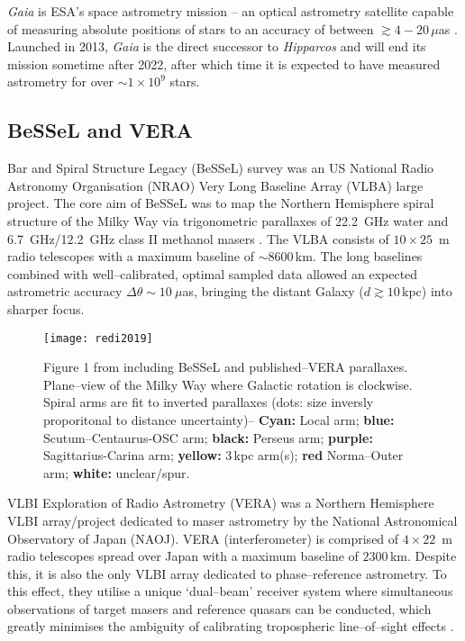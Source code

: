 		   {\it Gaia} is ESA's space astrometry mission -- an optical astrometry satellite capable of measuring absolute positions of stars to an accuracy of between $\gtrsim4-20\,\mu$as \citep[depending on magnitude and band; ][]{Perryman2002}. Launched in 2013, {\it Gaia} is the direct successor to {\it Hipparcos} and will end its mission sometime after 2022, after which time it is expected to have measured astrometry for over $\sim1\times10^9$ stars.
		
		    	        	
		\subsection{BeSSeL and VERA}
        Bar and Spiral Structure Legacy (BeSSeL) survey was an US National Radio Astronomy Organisation (NRAO) Very Long Baseline Array (VLBA) large project. The core aim of BeSSeL was to map the Northern Hemisphere spiral structure of the Milky Way via trigonometric parallaxes of 22.2~GHz water and 6.7~GHz/12.2~GHz class II methanol masers \citep{Brunthaler2011,Reid2009,Reid2014,Reid2019}. The VLBA consists of $10\times25$~m radio telescopes with a maximum baseline of $\sim8600$\,km. The long baselines combined with well--calibrated, optimal sampled data allowed an expected astrometric accuracy $\Delta\theta\sim10~\mu$as, bringing the distant Galaxy ($d\gtrsim10$\,kpc) into sharper focus.
		\begin{SCfigure}
			\centering
			\texttt{[image: redi2019]}
			\caption[\citet{Reid2019} Figure 1.]{Figure 1 from \citet{Reid2019} including BeSSeL and published--VERA parallaxes. Plane--view of the Milky Way where Galactic rotation is clockwise. Spiral arms are fit to inverted parallaxes (dots: size inversly proporitonal to distance uncertainty)-- {\bf Cyan:} Local arm; {\bf blue:} Scutum--Centaurus-OSC arm; {\bf black:} Perseus arm; {\bf purple:} Sagittarius-Carina arm; {\bf yellow:} 3\,kpc arm(s); {\bf red} Norma--Outer arm; {\bf white:} unclear/spur.}
			\label{intro:milkywayreid2019}
		\end{SCfigure}
        
		VLBI Exploration of Radio Astrometry (VERA) was a Northern Hemisphere VLBI array/project dedicated to maser astrometry by the National Astronomical Observatory of Japan (NAOJ). VERA (interferometer) is comprised of $4\times22$~m radio telescopes spread over Japan with a maximum baseline of $2300$\,km. Despite this, it is also the only VLBI array dedicated to phase--reference astrometry. To this effect, they utilise a unique `dual--beam' receiver system where simultaneous observations of target masers and reference quasars can be conducted, which greatly minimises the ambiguity of calibrating tropospheric line--of--sight effects \citep{Honma2003}. 
		
